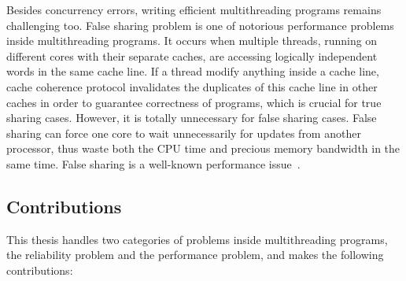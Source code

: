 Besides concurrency errors, writing efficient multithreading programs remains challenging too. False sharing problem is one of notorious performance problems inside multithreading programs. It occurs when multiple threads, running on different cores with their separate caches, are accessing logically independent words in the same cache line. If a thread modify anything inside a cache line, cache coherence protocol invalidates the duplicates of this cache line in other caches in order to guarantee correctness of programs, which is crucial for true sharing cases. However, it is totally unnecessary for false sharing cases. False sharing can force one core to wait unnecessarily for updates from another processor, thus waste both the CPU time and precious memory bandwidth in the same time. False sharing is a well-known performance issue~\cite{falseshare:Analysis, falseshare:effect}. 

\subsection*{Contributions}

This thesis handles two categories of problems inside multithreading programs, the reliability problem and the performance problem, and makes the following contributions:

